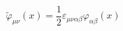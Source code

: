 \begin{equation}
\widetilde{\varphi }_{\mu \nu }(x)=\frac 12\varepsilon _{\mu \nu
\alpha \beta }\varphi _{\alpha \beta }(x) \label{4}
\end{equation}

